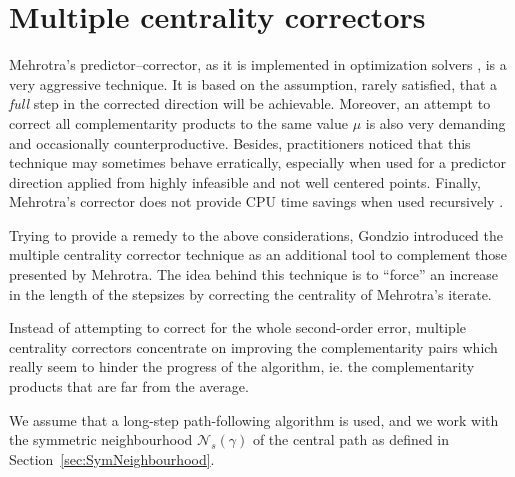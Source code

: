 %
%
\section{Multiple centrality correctors}
\label{sec:MultipleCC}

Mehrotra's predictor--corrector, as it is implemented in optimization 
solvers \cite{LustigMarstenShanno,Mehrotra92}, is a very aggressive 
technique. It is based on the assumption, rarely satisfied, that a 
{\it full} step in the corrected direction will be achievable.
Moreover, an attempt to correct all complementarity products to the 
same value $\mu$ is also very demanding and occasionally
counterproductive. 
Besides, practitioners noticed that this technique may sometimes 
behave erratically, especially when used for a predictor direction 
applied from highly infeasible and not well centered points. 
Finally, Mehrotra's corrector does not provide CPU time savings 
when used recursively \cite{CarpenterLustigMulveyShanno}.

Trying to provide a remedy to the above considerations, Gondzio 
\cite{Gondzio96} introduced the multiple centrality corrector technique 
as an additional tool to complement those presented by Mehrotra. 
The idea behind this technique is to ``force'' an increase in the 
length of the stepsizes by correcting the centrality of Mehrotra's 
iterate.

Instead of attempting to correct for the whole second-order error,
multiple centrality correctors 
concentrate on improving the complementarity pairs which really seem 
to hinder the progress of the algorithm, ie. the complementarity products 
that are far from the average.

We assume that a long-step path-following algorithm is used, 
and we work with the symmetric neighbourhood $\mathcal{N}_s(\gamma)$
of the central path as defined in Section~\ref{sec:SymNeighbourhood}.



